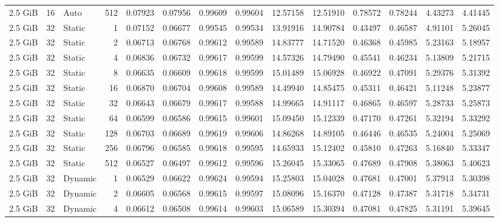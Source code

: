 \begin{table}[H]
\begin{adjustbox}{width=\textwidth, keepaspectratio}
\begin{tabular}{rrlrrrrrrrrrrr}
                    2.5 GiB & 16 & Auto & 512 & 0.07923 & 0.07956 & 0.99609 & 0.99604 & 12.57158 & 12.51910 & 0.78572 & 0.78244 & 4.43273 & 4.41445 \\
                    2.5 GiB & 32 & Static & 1 & 0.07152 & 0.06677 & 0.99545 & 0.99534 & 13.91916 & 14.90784 & 0.43497 & 0.46587 & 4.91101 & 5.26045 \\
                    2.5 GiB & 32 & Static & 2 & 0.06713 & 0.06768 & 0.99612 & 0.99589 & 14.83777 & 14.71520 & 0.46368 & 0.45985 & 5.23163 & 5.18957 \\
                    2.5 GiB & 32 & Static & 4 & 0.06836 & 0.06732 & 0.99617 & 0.99599 & 14.57326 & 14.79490 & 0.45541 & 0.46234 & 5.13809 & 5.21715 \\
                    2.5 GiB & 32 & Static & 8 & 0.06635 & 0.06609 & 0.99618 & 0.99599 & 15.01489 & 15.06928 & 0.46922 & 0.47091 & 5.29376 & 5.31392 \\
                    2.5 GiB & 32 & Static & 16 & 0.06870 & 0.06704 & 0.99608 & 0.99589 & 14.49940 & 14.85475 & 0.45311 & 0.46421 & 5.11248 & 5.23877 \\
                    2.5 GiB & 32 & Static & 32 & 0.06643 & 0.06679 & 0.99617 & 0.99588 & 14.99665 & 14.91117 & 0.46865 & 0.46597 & 5.28733 & 5.25873 \\
                    2.5 GiB & 32 & Static & 64 & 0.06599 & 0.06586 & 0.99615 & 0.99601 & 15.09450 & 15.12339 & 0.47170 & 0.47261 & 5.32194 & 5.33292 \\
                    2.5 GiB & 32 & Static & 128 & 0.06703 & 0.06689 & 0.99619 & 0.99606 & 14.86268 & 14.89105 & 0.46446 & 0.46535 & 5.24004 & 5.25069 \\
                    2.5 GiB & 32 & Static & 256 & 0.06796 & 0.06585 & 0.99618 & 0.99595 & 14.65933 & 15.12402 & 0.45810 & 0.47263 & 5.16840 & 5.33347 \\
                    2.5 GiB & 32 & Static & 512 & 0.06527 & 0.06497 & 0.99612 & 0.99596 & 15.26045 & 15.33065 & 0.47689 & 0.47908 & 5.38063 & 5.40623 \\
                    2.5 GiB & 32 & Dynamic & 1 & 0.06529 & 0.06622 & 0.99624 & 0.99594 & 15.25803 & 15.04028 & 0.47681 & 0.47001 & 5.37913 & 5.30398 \\
                    2.5 GiB & 32 & Dynamic & 2 & 0.06605 & 0.06568 & 0.99615 & 0.99597 & 15.08096 & 15.16370 & 0.47128 & 0.47387 & 5.31718 & 5.34731 \\
                    2.5 GiB & 32 & Dynamic & 4 & 0.06612 & 0.06508 & 0.99614 & 0.99603 & 15.06589 & 15.30394 & 0.47081 & 0.47825 & 5.31191 & 5.39645 \\

\end{tabular}
\end{adjustbox}
\end{table}
